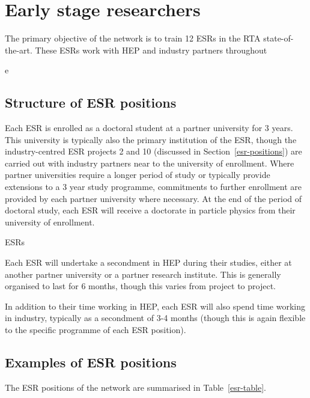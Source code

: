 \section{Early stage researchers}
\label{esrs}
The primary objective of the network is to train 12 ESRs in the RTA state-of-the-art. These ESRs work with HEP and industry partners throughout\par
e

\subsection{Structure of ESR positions}
\label{esr-structure}
Each ESR is enrolled as a doctoral student at a partner university for 3 years. This university is typically also the primary institution of the ESR, though the industry-centred ESR projects 2 and 10 (discussed in Section~\ref{esr-positions}) are carried out with industry partners near to the university of enrollment. Where partner universities require a longer period of study or typically provide extensions to a 3 year study programme, commitments to further enrollment are provided by each partner university where necessary. At the end of the period of doctoral study, each ESR will receive a doctorate in particle physics from their university of enrollment.\par
ESRs\par


Each ESR will undertake a secondment in HEP during their studies, either at another partner university or a partner research institute. This is generally organised to last for 6 months, though this varies from project to project.\par


In addition to their time working in HEP, each ESR will also spend time working in industry, typically as a secondment of 3-4 months (though this is again flexible to the specific programme of each ESR position).

\subsection{Examples of ESR positions}
\label{esr-examples}
The ESR positions of the network are summarised in Table~\ref{esr-table}. 

